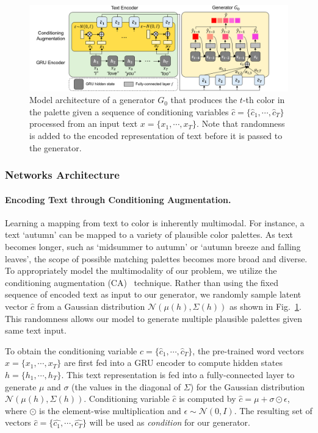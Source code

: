 \documentclass[runningheads]{llncs}
\begin{document}
\begin{figure}[t]
\centering
\includegraphics[width=\textwidth]{./tpn_generator.png}
\caption{Model architecture of a generator $G_{0}$ that produces the $t$-th color in the palette given a sequence of conditioning variables $\hat{c}=\{\hat{c}_{1},\cdots,\hat{c}_{T}\}$ processed from an input text $x=\{x_{1},\cdots,x_{T}\}$. Note that randomness is added to the encoded representation of text before it is passed to the generator.}\label{fig:ca_model}
\end{figure}

\subsubsection{Networks Architecture}
\paragraph{Encoding Text through Conditioning Augmentation.}
\label{sec:CA}
Learning a mapping from text to color is inherently multimodal. For instance, a text `autumn' can be mapped to a variety of plausible color palettes. As text becomes longer, such as `midsummer to autumn' or `autumn breeze and falling leaves', the scope of possible matching palettes becomes more broad and diverse. To appropriately model the multimodality of our problem, we utilize the conditioning augmentation (CA)~\cite{zhang2017stackgan} technique. Rather than using the fixed sequence of encoded text as input to our generator, we randomly sample latent vector $\hat{c}$ from a Gaussian distribution $\mathcal{N}(\mu(h),\Sigma(h))$ as shown in Fig.~\ref{fig:ca_model}. This randomness allows our model to generate multiple plausible palettes given same text input. 

To obtain the conditioning variable $\hat{c}=\{\hat{c}_{1},\cdots,\hat{c}_{T}\}$,
the pre-trained word vectors $x=\{x_{1},\cdots,x_{T}\}$ are first fed into a GRU encoder to compute hidden states $h=\{h_{1},\cdots,h_{T}\}$. This text representation is fed into a fully-connected layer to generate $\mu$ and $\sigma$ (the values in the diagonal of $\Sigma$) for the Gaussian distribution $\mathcal{N}(\mu(h),\Sigma(h))$. Conditioning variable $\hat{c}$ is computed by $\hat{c}=\mu+\sigma\odot\epsilon$, where $\odot$ is the element-wise multiplication and $\epsilon\sim\mathcal{N}(0,I)$. The resulting set of vectors $\hat{c}=\{\hat{c_{1}},\cdots,\hat{c_{T}}\}$ will be used as \emph{condition} for our generator. 
\end{document}
